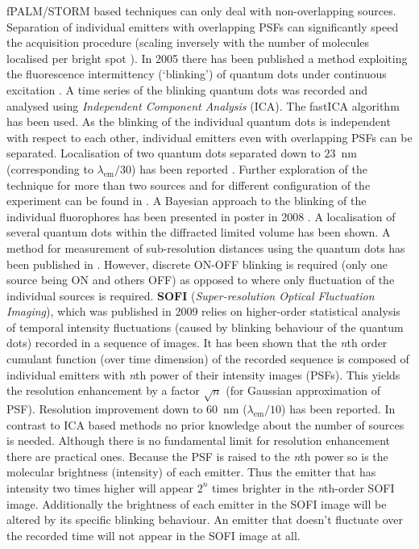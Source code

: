 fPALM/STORM based techniques can only deal with non-overlapping sources. Separation of individual emitters with overlapping PSFs can significantly speed the acquisition procedure (scaling inversely with the number of molecules localised per bright spot \citep{Small2009}). In 2005 there has been published a method exploiting the fluorescence intermittency (`blinking') of quantum dots under continuous excitation \citep{Lidke2005}. A time series of the blinking quantum dots was recorded and analysed using \emph{Independent Component Analysis} (ICA). The fastICA algorithm \citep{Hyvarinen2000} has been used. As the blinking of the individual quantum dots is independent with respect to each other, individual emitters even with overlapping PSFs can be separated. Localisation of two quantum dots separated down to $23$~nm (corresponding to $\lambda_{\mathrm{em}}/30$) has been reported \citep{Lidke2005}. Further exploration of the technique for more than two sources and for different configuration of the experiment can be found in \citep{Lidke2007}. A Bayesian approach to the blinking of the individual fluorophores has been presented in poster in 2008 \citep{Harrington2008}. A localisation of several quantum dots within the diffracted limited volume has been shown. A method for measurement of sub-resolution distances using the quantum dots has been published in \citep{Lagerholm2006}. However, discrete ON-OFF blinking is required (only one source being ON and others OFF) as opposed to \citep{Lidke2005,Harrington2008} where only fluctuation of the individual sources is required. \textbf{SOFI} (\emph{Super-resolution Optical Fluctuation Imaging}), which was published in 2009 \citep{Dertinger2009} relies on higher-order statistical analysis of temporal intensity fluctuations (caused by blinking behaviour of the quantum dots) recorded in a sequence of images. It has been shown that the \emph{n}th order cumulant function (over time dimension) of the recorded sequence is composed of individual emitters with \emph{n}th power of their intensity images (PSFs). This yields the resolution enhancement by a factor $\sqrt{n}$ (for Gaussian approximation of PSF). Resolution improvement down to 60~nm ($\lambda_{\mathrm{em}}/10$) has been reported. In contrast to ICA based methods no prior knowledge about the number of sources is needed. Although there is no fundamental limit for resolution enhancement there are practical ones. Because the PSF is raised to the \emph{n}th power so is the molecular brightness (intensity) of each emitter. Thus the emitter that has intensity two times higher will appear $2^{n}$ times brighter in the \emph{n}th-order SOFI image. Additionally the brightness of each emitter in the SOFI image will be altered by its specific blinking behaviour. An emitter that doesn't fluctuate over the recorded time will not appear in the SOFI image at all.
%

